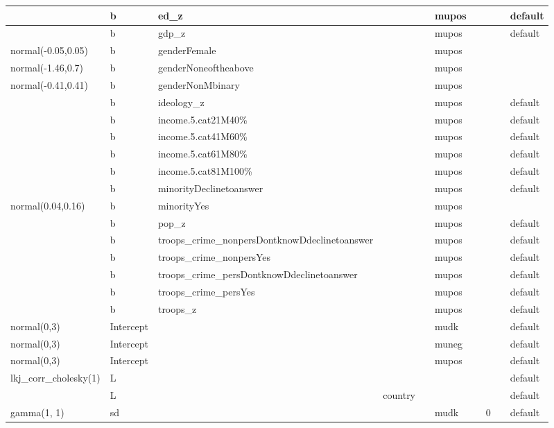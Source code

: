 \documentclass[
]{book}
\theoremstyle{definition}
\theoremstyle{definition}
\theoremstyle{definition}
\theoremstyle{definition}
\theoremstyle{remark}
\begin{document}
\begin{table}
\begin{tabular}[t]{l|l|l|l|l|l|l|l|l|l}
\hline
 & b & ed\_z &  &  & mupos &  &  &  & default\\
\hline
 & b & gdp\_z &  &  & mupos &  &  &  & default\\
\hline
normal(-0.05,0.05) & b & genderFemale &  &  & mupos &  &  &  & \\
\hline
normal(-1.46,0.7) & b & genderNoneoftheabove &  &  & mupos &  &  &  & \\
\hline
normal(-0.41,0.41) & b & genderNonMbinary &  &  & mupos &  &  &  & \\
\hline
 & b & ideology\_z &  &  & mupos &  &  &  & default\\
\hline
 & b & income.5.cat21M40\% &  &  & mupos &  &  &  & default\\
\hline
 & b & income.5.cat41M60\% &  &  & mupos &  &  &  & default\\
\hline
 & b & income.5.cat61M80\% &  &  & mupos &  &  &  & default\\
\hline
 & b & income.5.cat81M100\% &  &  & mupos &  &  &  & default\\
\hline
 & b & minorityDeclinetoanswer &  &  & mupos &  &  &  & default\\
\hline
normal(0.04,0.16) & b & minorityYes &  &  & mupos &  &  &  & \\
\hline
 & b & pop\_z &  &  & mupos &  &  &  & default\\
\hline
 & b & troops\_crime\_nonpersDontknowDdeclinetoanswer &  &  & mupos &  &  &  & default\\
\hline
 & b & troops\_crime\_nonpersYes &  &  & mupos &  &  &  & default\\
\hline
 & b & troops\_crime\_persDontknowDdeclinetoanswer &  &  & mupos &  &  &  & default\\
\hline
 & b & troops\_crime\_persYes &  &  & mupos &  &  &  & default\\
\hline
 & b & troops\_z &  &  & mupos &  &  &  & default\\
\hline
normal(0,3) & Intercept &  &  &  & mudk &  &  &  & default\\
\hline
normal(0,3) & Intercept &  &  &  & muneg &  &  &  & default\\
\hline
normal(0,3) & Intercept &  &  &  & mupos &  &  &  & default\\
\hline
lkj\_corr\_cholesky(1) & L &  &  &  &  &  &  &  & default\\
\hline
 & L &  & country &  &  &  &  &  & default\\
\hline
gamma(1, 1) & sd &  &  &  & mudk &  & 0 &  & default\\

\end{tabular}
\end{table}
\end{document}
